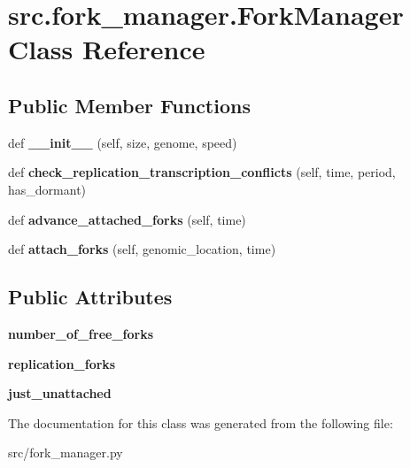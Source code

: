 \hypertarget{classsrc_1_1fork__manager_1_1ForkManager}{}\section{src.\+fork\+\_\+manager.\+Fork\+Manager Class Reference}
\label{classsrc_1_1fork__manager_1_1ForkManager}
\subsection*{Public Member Functions}
\begin{DoxyCompactItemize}
\item 
\mbox{\label{classsrc_1_1fork__manager_1_1ForkManager_a1c4e96376afefb86d06a3ee76cd9f8fd}} 
def {\bfseries \+\_\+\+\_\+init\+\_\+\+\_\+} (self, size, genome, speed)
\item 
\mbox{\label{classsrc_1_1fork__manager_1_1ForkManager_a8d396be3bf6630aa4d19056875495ca1}} 
def {\bfseries check\+\_\+replication\+\_\+transcription\+\_\+conflicts} (self, time, period, has\+\_\+dormant)
\item 
\mbox{\label{classsrc_1_1fork__manager_1_1ForkManager_aee1717a670dbc2e1630ae55001997b39}} 
def {\bfseries advance\+\_\+attached\+\_\+forks} (self, time)
\item 
\mbox{\label{classsrc_1_1fork__manager_1_1ForkManager_a810da12eeaf2b2d7f5e4bb43df1605fd}} 
def {\bfseries attach\+\_\+forks} (self, genomic\+\_\+location, time)
\end{DoxyCompactItemize}
\subsection*{Public Attributes}
\begin{DoxyCompactItemize}
\item 
\mbox{\label{classsrc_1_1fork__manager_1_1ForkManager_a57ecf1958e93b8cce37cfe8a2672c774}} 
{\bfseries number\+\_\+of\+\_\+free\+\_\+forks}
\item 
\mbox{\label{classsrc_1_1fork__manager_1_1ForkManager_a24ad4d17018dcb4125995e9fe7b4760c}} 
{\bfseries replication\+\_\+forks}
\item 
\mbox{\label{classsrc_1_1fork__manager_1_1ForkManager_a48458d9bef1e1d1537d8acae052dc01e}} 
{\bfseries just\+\_\+unattached}
\end{DoxyCompactItemize}


The documentation for this class was generated from the following file\+:\begin{DoxyCompactItemize}
\item 
src/fork\+\_\+manager.\+py\end{DoxyCompactItemize}

